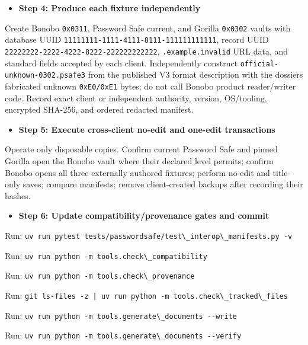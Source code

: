 \documentclass[
  letterpaper,
]{article}
\newcommand{\passthrough}[1]{#1}
\providecommand{\tightlist}{%
  \setlength{\itemsep}{0pt}\setlength{\parskip}{0pt}}
\begin{document}
\begin{itemize}
\tightlist
\item[$\square$]
  \textbf{Step 4: Produce each fixture independently}
\end{itemize}

Create Bonobo \passthrough{\lstinline!0x0311!}, Password Safe current, and Gorilla \passthrough{\lstinline!0x0302!}
vaults with database UUID \nolinkurl{11111111-1111-4111-8111-111111111111}, record UUID
\nolinkurl{22222222-2222-4222-8222-222222222222}, \nolinkurl{.example.invalid} URL data, and standard fields accepted by
each client. Independently construct \nolinkurl{official-unknown-0302.psafe3} from the published V3 format description
with the dossier\textquotesingle s fabricated unknown \passthrough{\lstinline!0xE0/0xE1!} bytes; do not call Bonobo
product reader/writer code. Record exact client or independent authority, version, OS/tooling, encrypted SHA-256, and
ordered redacted manifest.

\begin{itemize}
\tightlist
\item[$\square$]
  \textbf{Step 5: Execute cross-client no-edit and one-edit transactions}
\end{itemize}

Operate only disposable copies. Confirm current Password Safe and pinned Gorilla open the Bonobo vault where their
declared level permits; confirm Bonobo opens all three externally authored fixtures; perform no-edit and title-only
saves; compare manifests; remove client-created backups after recording their hashes.

\begin{itemize}
\tightlist
\item[$\square$]
  \textbf{Step 6: Update compatibility/provenance gates and commit}
\end{itemize}

Run: \passthrough{\lstinline!uv run pytest tests/passwordsafe/test\_interop\_manifests.py -v!}

Run: \passthrough{\lstinline!uv run python -m tools.check\_compatibility!}

Run: \passthrough{\lstinline!uv run python -m tools.check\_provenance!}

Run: \passthrough{\lstinline!git ls-files -z | uv run python -m tools.check\_tracked\_files!}

Run: \passthrough{\lstinline!uv run python -m tools.generate\_documents --write!}

Run: \passthrough{\lstinline!uv run python -m tools.generate\_documents --verify!}
\end{document}
